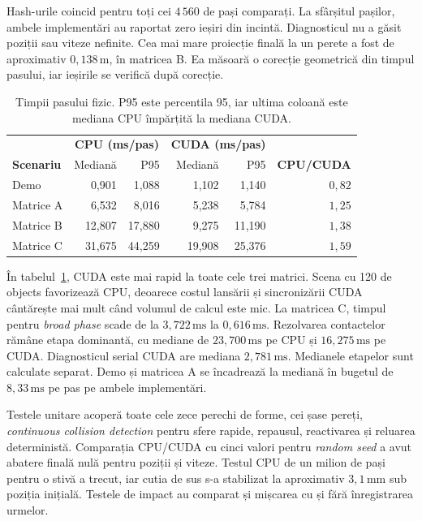 \documentclass[11pt,a4paper]{article}
\begin{document}
Hash-urile coincid pentru toți cei \(4\,560\) de pași comparați.
La sfârșitul pașilor, ambele implementări au raportat zero ieșiri
din incintă. Diagnosticul nu a găsit poziții sau viteze nefinite.
Cea mai mare proiecție finală la un perete a fost de aproximativ
\(0{,}138\,\mathrm m\), în matricea B. Ea măsoară o corecție
geometrică din timpul pasului, iar ieșirile se verifică după corecție.

\begin{table}[!htbp]
\centering\small
\begin{tabular}{@{}lrrrrr@{}}
\hline
& \multicolumn{2}{c}{\textbf{CPU (ms/pas)}} &
  \multicolumn{2}{c}{\textbf{CUDA (ms/pas)}} & \\
\textbf{Scenariu} & Mediană & P95 & Mediană & P95 & \textbf{CPU/CUDA} \\
\hline
Demo      &  0,901 &  1,088 &  1,102 &  1,140 & \(0{,}82\) \\
Matrice A &  6,532 &  8,016 &  5,238 &  5,784 & \(1{,}25\) \\
Matrice B & 12,807 & 17,880 &  9,275 & 11,190 & \(1{,}38\) \\
Matrice C & 31,675 & 44,259 & 19,908 & 25,376 & \(1{,}59\) \\
\hline
\end{tabular}
\caption{Timpii pasului fizic. P95 este percentila 95, iar ultima coloană
este mediana CPU împărțită la mediana CUDA.}
\label{tab:timing}
\end{table}

În tabelul~\ref{tab:timing}, CUDA este mai rapid la toate cele
trei matrici. Scena cu 120 de objects favorizează CPU, deoarece
costul lansării și sincronizării CUDA cântărește mai mult când volumul
de calcul este mic. La matricea C, timpul pentru \emph{broad phase}
scade de la \(3{,}722\,\mathrm{ms}\) la \(0{,}616\,\mathrm{ms}\).
Rezolvarea contactelor rămâne etapa dominantă, cu mediane de
\(23{,}700\,\mathrm{ms}\) pe CPU și \(16{,}275\,\mathrm{ms}\) pe CUDA.
Diagnosticul serial CUDA are mediana \(2{,}781\,\mathrm{ms}\).
Medianele etapelor sunt calculate separat. Demo și matricea A
se încadrează la mediană în bugetul de \(8{,}33\,\mathrm{ms}\)
pe pas pe ambele implementări.

Testele unitare acoperă toate cele zece perechi de forme,
cei șase pereți, \emph{continuous collision detection} pentru sfere rapide,
repausul, reactivarea și reluarea deterministă. Comparația
CPU/CUDA cu cinci valori pentru \emph{random seed} a avut abatere finală nulă pentru
poziții și viteze. Testul CPU de un milion de pași pentru
o stivă a trecut, iar cutia de sus s-a stabilizat la
aproximativ \(3{,}1\,\mathrm{mm}\) sub poziția inițială.
Testele de impact au comparat și mișcarea cu și fără
înregistrarea urmelor.
\end{document}
